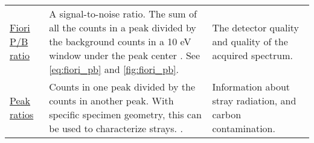 \begin{table}[htp]
\begin{tabular}{p{2.5cm}p{8cm}p{3.5cm}}
        \hyperref[theory:eds_performance:fiori]{Fiori P/B ratio}                    & A signal-to-noise ratio. The sum of all the counts in a peak divided by the background counts in a 10 eV window under the peak center  \cite{fiori_peak_background_1982,williams_carter_tem_2009}. See \cref{eq:fiori_pb} and \cref{fig:fiori_pb}.          & The detector quality and quality of the acquired spectrum.         \\
        \hyperref[theory:eds_performance:peakratio]{Peak ratios}                    & Counts in one peak divided by the counts in another peak. With specific specimen geometry, this can be used to characterize strays. \cite{egerton_nio_characterization_1994,ted_pella_nio_tem_2019}.                                                        & Information about stray radiation, and carbon contamination.       \\
        \hline
    \end{tabular}
\end{table}